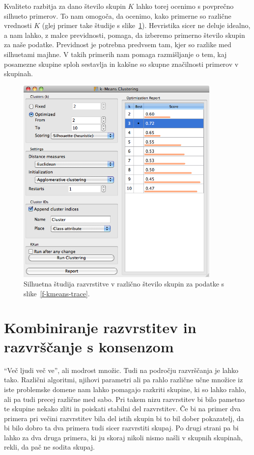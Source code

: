 Kvaliteto razbitja za dano število skupin $K$ lahko torej ocenimo s
povprečno silhueto primerov. To nam omogoča, da ocenimo, kako primerne
so različne vrednosti $K$ (glej primer take študije s
slike~\ref{f-kmeans-silhouette-study}). Hevristika sicer ne deluje
idealno, a nam lahko, z malce previdnosti, pomaga, da izberemo
primerno število skupin za naše podatke. Previdnost je potrebna
predvsem tam, kjer so razlike med silhuetami majhne. V takih primerih
nam pomaga razmišljanje o tem, kaj posamezne skupine sploh sestavlja
in kakšne so skupne značilnosti primerov v skupinah.

\begin{figure}[htbp]
\begin{center}
\includegraphics[width=10cm]{slike/kmeans-silhouette-study.png}
\caption{Silhuetna študija razvrstitve v različno število skupin za
  podatke s slike~\ref{f-kmeans-trace}.}
\label{f-kmeans-silhouette-study}
\end{center}
\end{figure}

\section{Kombiniranje razvrstitev in razvrščanje s konsenzom}

``Več ljudi več ve'', ali modrost množic. Tudi na področju razvrščanja
je lahko tako. Različni algoritmi, njihovi parametri ali pa rahlo
različne učne množice iz iste problemske domene nam lahko pomagajo
razkriti skupine, ki so lahko rahlo, ali pa tudi precej različne med
sabo. Pri takem nizu razvrstitev bi bilo pametno te skupine nekako
zliti in poiskati stabilni del razvrstitev. Če bi na primer dva
primera pri večini razvrstitev bila del istih skupin bi to bil dober
pokazatelj, da bi bilo dobro ta dva primera tudi sicer razvrstiti
skupaj. Po drugi strani pa bi lahko za dva druga primera, ki ju skoraj
nikoli nismo našli v skupnih skupinah, rekli, da pač ne sodita skupaj.

